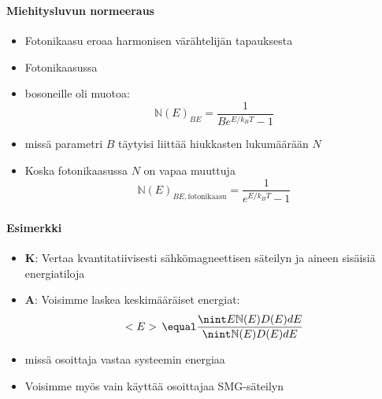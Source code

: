 \begin{frame}
\frametitle{\texorpdfstring{\culine[\sectiontitleulinecolor]{\sectiontitle}}{\sectiontitle} }
\framesubtitle{Miehitysluvun normeeraus}
\appear{}
\begin{itemize}[itemsep=1.7mm]
	\item Fotonikaasu eroaa harmonisen värähtelijän tapauksesta

\item Fotonikaasussa  

\item {} bosoneille oli muotoa: 
\[ \mathbb{N} (E)_{B E}  \equal  \frac{1}{B e^{E / k_{B} T}-1}
\] 
\item[] missä parametri $B$ täytyisi liittää hiukkasten lukumäärään $N$ 

\item Koska fotonikaasussa $N$ on vapaa muuttuja 
\[
 \mathbb{N} (E)_{B E, \text {fotonikaasu}}=\frac{1}{e^{E / k_{B} T}-1}
\]
\end{itemize}

\endofslide 
\end{frame}

\begin{frame}
\frametitle{\texorpdfstring{\culine[\sectiontitleulinecolor]{\sectiontitle}}{\sectiontitle} }
\framesubtitle{Esimerkki}

\appear{}
\begin{itemize}[itemsep=3mm]
	\item \textbf{K}: Vertaa kvantitatiivisesti sähkömagneettisen säteilyn ja aineen sisäisiä energiatiloja
\item \textbf{A}: Voisimme laskea keskimääräiset energiat: 
\[
<E>\,  \equal  \frac{\nint E  \mathbb{N} (E) D(E) d E}{\nint  \mathbb{N} (E) D(E) d E}
\]
\item[] missä osoittaja vastaa systeemin energiaa  

\item Voisimme myös vain käyttää osoittajaa SMG-säteilyn   
\end{itemize}

\endofslide 
\end{frame}

